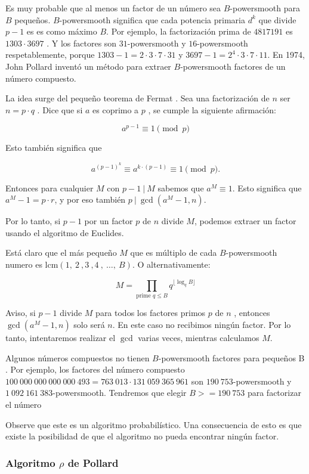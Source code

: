 Es muy probable que al menos un factor de un número sea $B$-powersmooth para $B$ pequeños. $B$-powersmooth significa que cada potencia primaria $d^k$ que divide $p-1$ es es como máximo $B$. Por ejemplo, la factorización prima de $4817191$ es $1303 \cdot 3697$ . Y los factores son $31$-powersmooth y $16$-powersmooth respetablemente, porque  $1303 - 1 = 2 \cdot 3 \cdot 7 \cdot 31$ y $3697 - 1 = 2^4 \cdot 3 \cdot 7 \cdot 11$. En 1974, John Pollard inventó un método para extraer $B$-powersmooth factores  de un número compuesto.

La idea surge del pequeño teorema de Fermat . Sea una factorización de $n$  ser $n = p \cdot q$ . Dice que si $a$ es coprimo a $p$ , se cumple la siguiente afirmación:

$$a^{p - 1} \equiv 1 \pmod{p}$$

Esto también significa que

$$a^{(p - 1)^k} \equiv a^{k \cdot (p - 1)} \equiv 1 \pmod{p}.$$

Entonces para cualquier $M$ con $p - 1 ~|~ M$ sabemos que $a^M \equiv 1$. Esto significa que  $a^M - 1 = p \cdot r$, y por eso también $p ~|~ \gcd(a^M - 1, n)$.

Por lo tanto, si $p-1$ por un factor $p$ de $n$ divide $M$, podemos extraer un factor usando el algoritmo de Euclides.

Está claro que el más pequeño $M$ que es múltiplo de cada $B$-powersmooth numero es $\text{lcm}(1,~2~,3~,4~,~\dots,~B)$. O alternativamente:

 $$M = \prod_{\text{prime } q \le B} q^{\lfloor \log_q B \rfloor}$$
 
Aviso, si $p-1$ divide $M$ para todos los factores primos $p$ de $n$ , entonces $\gcd(a^M - 1, n)$ solo será $n$. En este caso no recibimos ningún factor. Por lo tanto, intentaremos realizar el $\gcd$ varias veces, mientras calculamos $M$.

Algunos números compuestos no tienen $B$-powersmooth factores para pequeños B . Por ejemplo, los factores del número compuesto $100~000~000~000~000~493 = 763~013 \cdot 131~059~365~961$ son $190~753$-powersmooth y $1~092~161~383$-powersmooth. Tendremos que elegir $B >= 190~753$ para factorizar el número

Observe que este es un algoritmo probabilístico. Una consecuencia de esto es que existe la posibilidad de que el algoritmo no pueda encontrar
ningún factor.

\subsubsection{Algoritmo $\rho$ de Pollard}

